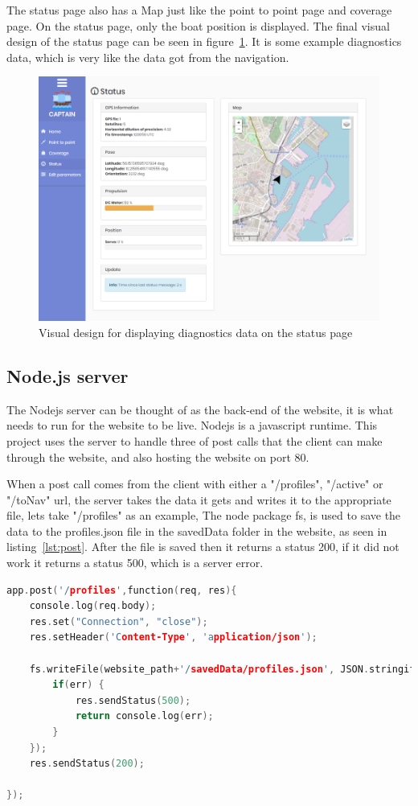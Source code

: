The status page also has a Map just like the point to point page and coverage page. On the status page, only the boat position is displayed. The final visual design of the status page can be seen in figure~\ref{fig:statuspage}. It is some example diagnostics data, which is very like the data got from the navigation.

\begin{figure}[H]
\centering
\includegraphics[width=0.7\linewidth]{Images/Implementation/status_page}
\caption{Visual design for displaying diagnostics data on the status page}
\label{fig:statuspage}
\end{figure}


\subsection{Node.js server}
\label{sec:nodejs_server}
The Nodejs server can be thought of as the back-end of the website, it is what needs to run for the website to be live. Nodejs is a javascript runtime\cite{nodejs}. This project uses the server to handle three of post calls that the client can make through the website, and also hosting the website on port 80. 

When a post call comes from the client with either a "/profiles", "/active" or "/toNav" url, the server takes the data it gets and writes it to the appropriate file, lets take "/profiles" as an example, The node package fs, is used to save the data to the profiles.json file in the savedData folder in the website, as seen in listing~\ref{lst:post}. After the file is saved then it returns a status 200, if it did not work it returns a status 500, which is a server error.

\begin{lstlisting}[caption = {Handeling a POST call to url "/profiles"}, captionpos=b, label={lst:post}, language=C++,firstnumber=1]
app.post('/profiles',function(req, res){
	console.log(req.body);
	res.set("Connection", "close");
	res.setHeader('Content-Type', 'application/json');

	fs.writeFile(website_path+'/savedData/profiles.json', JSON.stringify(req.body), function(err) {
	    if(err) {
			res.sendStatus(500);
	        return console.log(err);
	    }
	});
	res.sendStatus(200);

});
\end{lstlisting}

